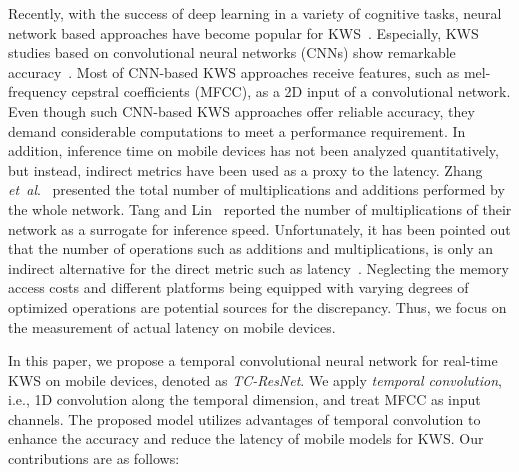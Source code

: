 \documentclass[a4paper]{article}
\begin{document}
Recently, with the success of deep learning in a variety of cognitive tasks, neural network based approaches have become popular for KWS~\cite{wang-arxiv-2017-ctc, sainath-interspeech-2015-cnn,  zhang-arxiv-2017-helloedge, tang-icassp-2018-residual, deandrade-arxiv-2018-attention, arik-interspeech-2017-crnn}.
Especially, KWS studies based on convolutional neural networks (CNNs) show remarkable accuracy~\cite{sainath-interspeech-2015-cnn, zhang-arxiv-2017-helloedge, tang-icassp-2018-residual}.
Most of CNN-based KWS approaches receive features, such as mel-frequency cepstral coefficients (MFCC), as a 2D input of a convolutional network.
Even though such CNN-based KWS approaches offer reliable accuracy, they demand considerable computations to meet a performance requirement.
In addition, inference time on mobile devices has not been analyzed quantitatively, but instead, indirect metrics have been used as a proxy to the latency.
Zhang \emph{et~al}.~\cite{zhang-arxiv-2017-helloedge} presented the total number of multiplications and additions performed by the whole network.
Tang and Lin~\cite{tang-icassp-2018-residual} reported the number of multiplications of their network as a surrogate for inference speed.
Unfortunately, it has been pointed out that the number of operations such as additions and multiplications, is only an indirect alternative for the direct metric such as latency~\cite{sandler-cvpr-2018-mobilenetv2, tan-arxiv-2018-mnasnet, ma-eccv-2018-shufflenetv2}.
Neglecting the memory access costs and different platforms being equipped with varying degrees of optimized operations are potential sources for the discrepancy.
Thus, we focus on the measurement of actual latency on mobile devices.

In this paper, we propose a temporal convolutional neural network for real-time KWS on mobile devices, denoted as \emph{TC-ResNet}.
We apply \emph{temporal convolution}, i.e., 1D convolution along the temporal dimension, and treat MFCC as input channels.
The proposed model utilizes advantages of temporal convolution to enhance the accuracy and reduce the latency of mobile models for KWS.
Our contributions are as follows:
\end{document}
